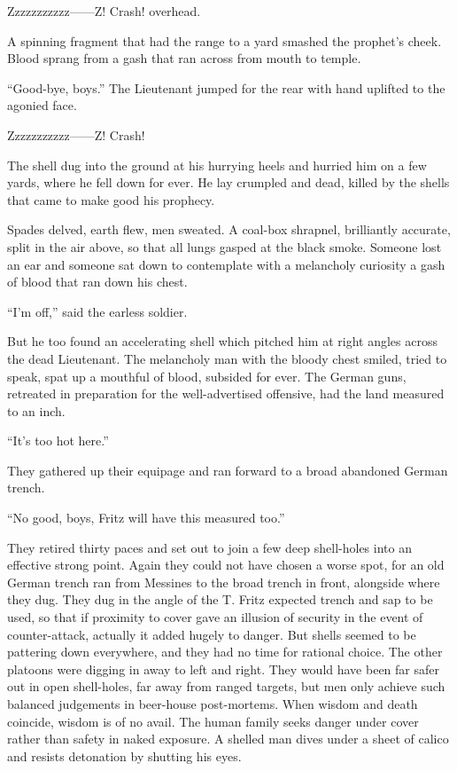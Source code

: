 Zzzzzzzzzzz------Z! Crash! overhead.

A spinning fragment that had the range to a yard smashed the prophet's cheek. Blood sprang from a gash that ran across from mouth to temple.

``Good-bye, boys.'' The Lieutenant jumped for the rear with hand uplifted to the agonied face.

Zzzzzzzzzzz------Z! Crash!

The shell dug into the ground at his hurrying heels and hurried him on a few yards, where he fell down for ever. He lay crumpled and dead, killed by the shells that came to make good his prophecy.

Spades delved, earth flew, men sweated. A coal-box shrapnel, brilliantly accurate, split in the air above, so that all lungs gasped at the black smoke. Someone lost an ear and someone sat down to contemplate with a melancholy curiosity a gash of blood that ran down his chest.

``I'm off,'' said the earless soldier.

But he too found an accelerating shell which pitched him at right angles across the dead Lieutenant. The melancholy man with the bloody chest smiled, tried to speak, spat up a mouthful of blood, subsided for ever. The German guns, retreated in preparation for the well-advertised offensive, had the land measured to an inch.

``It's too hot here.''

They gathered up their equipage and ran forward to a broad abandoned German trench.

``No good, boys, Fritz will have this measured too.''

They retired thirty paces and set out to join a few deep shell-holes into an effective strong point. Again they could not have chosen a worse spot, for an old German trench ran from Messines to the broad trench in front, alongside where they dug. They dug in the angle of the T. Fritz expected trench and sap to be used, so that if proximity to cover gave an illusion of security in the event of counter-attack, actually it added hugely to danger. But shells seemed to be pattering down everywhere, and they had no time for rational choice. The other platoons were digging in away to left and right. They would have been far safer out in open shell-holes, far away from ranged targets, but men only achieve such balanced judgements in beer-house post-mortems. When wisdom and death coincide, wisdom is of no avail. The human family seeks danger under cover rather than safety in naked exposure. A shelled man dives under a sheet of calico and resists detonation by shutting his eyes.

